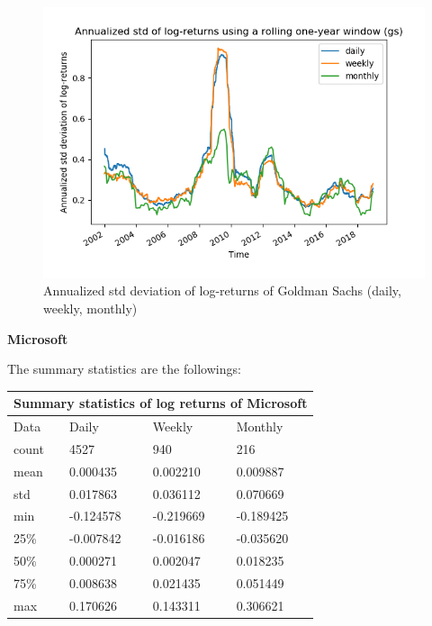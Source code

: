 \documentclass[10pt]{article}
\newenvironment{exercise}[2][Exercise]{\begin{trivlist}
  \item[\hskip \labelsep {\bfseries #1}\hskip \labelsep {\bfseries #2.}]}{\end{trivlist}}
\begin{document}
\begin{exercise}{4}
\begin{figure}[H]
		\centering
		\includegraphics[scale=0.5]{Figures/problem4d_std_gs.png}	
		\caption{Annualized std deviation of log-returns of Goldman Sachs (daily, weekly, monthly)}	
		\label{fig:problem3d_std_gs}
	
	\end{figure}

	\bigbreak	
		
	\textbf{Microsoft}
	
	\smallbreak
	
	The summary statistics are the followings:
	
	\bigbreak	
	
	\begin{tabular}{ |p{3cm}||p{3cm}|p{3cm}|p{3cm}|  }
 		\hline
		\multicolumn{4}{|c|}{Summary statistics of log returns of Microsoft} \\
		\hline
		Data & Daily & Weekly & Monthly\\
 		\hline
 		count   &  4527 & 940 & 216\\
 		mean & 0.000435 & 0.002210 & 0.009887\\
 		std & 0.017863 & 0.036112 & 0.070669\\
 		min & -0.124578 & -0.219669 & -0.189425\\
 		25\% & -0.007842 & -0.016186 & -0.035620\\
 		50\% & 0.000271 & 0.002047 & 0.018235\\
 		75\% & 0.008638 & 0.021435 & 0.051449\\
 		max & 0.170626 & 0.143311 & 0.306621\\
 		\hline
	\end{tabular}
	

\end{exercise}
\end{document}
